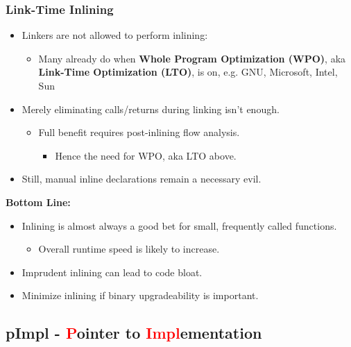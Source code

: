 \subsubsection{Link-Time Inlining}
\begin{itemize}
	\item Linkers are not allowed to perform inlining:
	\begin{itemize}
		\item Many already do when \textbf{Whole Program Optimization (WPO)}, aka \textbf{Link-Time Optimization (LTO)}, is on, e.g. GNU, Microsoft, Intel, Sun
	\end{itemize}
	\item Merely eliminating calls/returns during linking isn't enough.
	\begin{itemize}
		\item Full benefit requires post-inlining flow analysis.
		\begin{itemize}
			\item Hence the need for WPO, aka LTO above.
		\end{itemize}
	\end{itemize}
	\item Still, manual inline declarations remain a necessary evil.
\end{itemize}
\textbf{Bottom Line:}\\
\begin{itemize}
	\item Inlining is almost always a good bet for small, frequently called functions.
	\begin{itemize}
		\item Overall runtime speed is likely to increase.
	\end{itemize}
	\item Imprudent inlining can lead to code bloat.
	\item Minimize inlining if binary upgradeability is important.
\end{itemize}

\subsection[pImpl]{pImpl - \textcolor{red}{P}ointer to \textcolor{red}{Impl}ementation}
\label{sec:pimpl}

